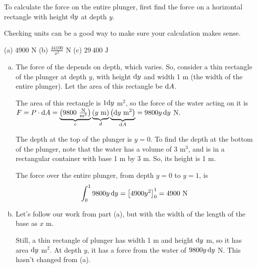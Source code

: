 \begin{hint}
To calculate the force on the entire plunger, first find the force on a horizontal rectangle with height $\mathrm{d}y$ at depth $y$.

Checking units can be a good way to make sure your calculation makes sense.
\end{hint}
\begin{answer}
(a) 4900 N \qquad (b) $\frac{44100}{x^2}\text{ N}$ \qquad (c) $29\,400\text{ J}$
\end{answer}
\begin{solution}
\begin{enumerate}[(a)]
\item The force of the depends on depth, which varies. So, consider a thin rectangle of the plunger at depth $y$, with height $\mathrm{d}y$ and width 1 m (the width of the entire plunger). Let the area of this rectangle be $\mathrm{d}A$.

\begin{center}
\end{center}


The area of this rectangle is $1\mathrm{d}y$ m$^2$, so the force of the water acting on it is $F=P\cdot\mathrm{d}A = \underbrace{\left(9800~\tfrac{\text{N}}{\text{m}^3}\right)}_c\underbrace{\left(y\text{ m}\right)}_d \underbrace{\left(\mathrm{d}y \text{ m}^2\right)}_{\mathrm{d}A} = 9800y\,\mathrm{d}y$ N.

The depth at the top of the plunger is $y=0$. To find the depth at the bottom of the plunger, note that the water has a volume of 3 m$^3$, and is in a rectangular container with base 1 m by 3 m. So, its height is 1 m.

The force over the entire plunger, from depth $y=0$ to $y=1$, is
\[\int_0^1 9800y\,\mathrm{d}y =  \big[4900 y^2\big]_0^1 = 4900 \text{ N}\]

\item Let's follow our work from part (a), but with the width of the length of the base as $x$ m.

Still, a thin rectangle of plunger has width 1 m and height $\mathrm{d}y$ m, so it has area $\mathrm{d}y$ m$^2$. At depth $y$, it has a force from the water of $9800y\,\mathrm{d}y$ N. This hasn't changed from (a).


\end{enumerate}
\end{solution}
